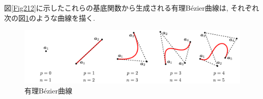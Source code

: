 \documentclass{jsarticle}
\theoremstyle{definition}%
\begin{document}
\noindent
図\ref{Fig212}に示したこれらの基底関数から生成される有理B\'ezier曲線は, それぞれ次の図\ref{Fig213}のような曲線を描く.
\addtocounter{footnote}{-1}
\begin{figure}[H]
	\centering
    \includegraphics[page=7,clip,width=130mm]{fig.pdf}
	\caption{有理B\'ezier曲線 \protect\footnotemark}
	\label{Fig213}
\end{figure}


\clearpage
\end{document}
